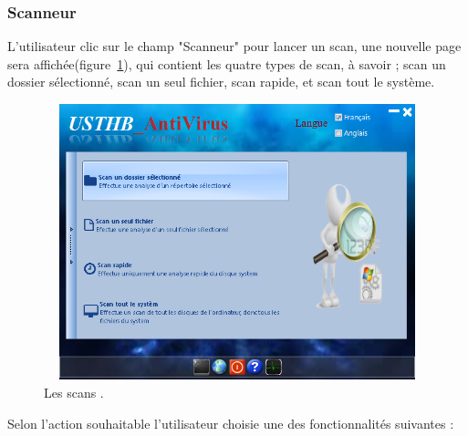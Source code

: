 \subsubsection{Scanneur}
L'utilisateur clic sur le champ "Scanneur" pour lancer un scan, une nouvelle page sera affichée(figure~\ref{fig :ant3}), qui contient les quatre types de scan, à savoir ; scan un dossier sélectionné, scan un seul fichier, scan rapide, et scan tout le système.\\
\begin{figure}[H]
\begin{center}
\includegraphics[width=13cm, height=8cm]{Figures/ant3.png}
\caption{Les scans .}
\label{fig :ant3} 
\end{center}
\end{figure}
Selon l'action souhaitable l'utilisateur choisie une des fonctionnalités suivantes :\\

